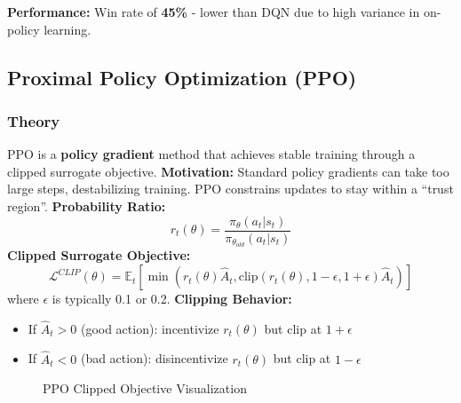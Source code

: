 \documentclass[12pt,a4paper]{article}
\begin{document}
\textbf{Performance:} Win rate of \textbf{45\%} - lower than DQN due to high variance in on-policy learning.
\subsection{Proximal Policy Optimization (PPO)}
\label{subsec:ppo}
\subsubsection{Theory}
PPO is a \textbf{policy gradient} method that achieves stable training through a clipped surrogate objective.
\textbf{Motivation:} Standard policy gradients can take too large steps, destabilizing training. PPO constrains updates to stay within a ``trust region''.
\textbf{Probability Ratio:}
\begin{equation}
    r_t(\theta) = \frac{\pi_\theta(a_t|s_t)}{\pi_{\theta_{old}}(a_t|s_t)}
\end{equation}
\textbf{Clipped Surrogate Objective:}
\begin{equation}
    \mathcal{L}^{CLIP}(\theta) = \mathbb{E}_t \left[ \min \left( r_t(\theta) \hat{A}_t, \text{clip}(r_t(\theta), 1-\epsilon, 1+\epsilon) \hat{A}_t \right) \right]
\end{equation}
where $\epsilon$ is typically 0.1 or 0.2.
\textbf{Clipping Behavior:}
\begin{itemize}
    \item If $\hat{A}_t > 0$ (good action): incentivize $r_t(\theta)$ but clip at $1+\epsilon$
    \item If $\hat{A}_t < 0$ (bad action): disincentivize $r_t(\theta)$ but clip at $1-\epsilon$
\end{itemize}
\begin{figure}[H]
\centering
{}
\caption{PPO Clipped Objective Visualization}
\label{fig:ppo_clip}
\end{figure}
\end{document}
